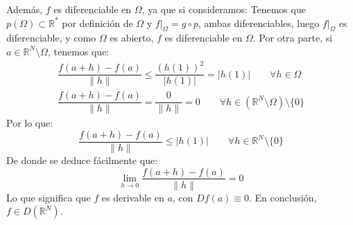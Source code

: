 \begin{ejercicio}
    \noindent
    Además, $f$ es diferenciable en $\Omega$, ya que si consideramos:
    Tenemos que $p(\Omega) \subset \mathbb{R}^\ast$ por definición de $\Omega$ y $f\big|_\Omega = g\circ p$, ambas diferenciables, luego $f\big|_\Omega$ es diferenciable, y como $\Omega$ es abierto, $f$ es diferenciable en $\Omega$. Por otra parte, si $a\in \mathbb{R}^N\setminus\Omega$, tenemos que:
    \begin{gather*}
        \dfrac{f(a+h)-f(a)}{\|h\|} \leq \dfrac{{(h(1))}^{2}}{|h(1)|} = |h(1)| \qquad \forall h\in \Omega \\
        \dfrac{f(a+h)-f(a)}{\|h\|} = \dfrac{0}{\|h\|} = 0 \qquad \forall h\in \left(\mathbb{R}^N\setminus \Omega\right)\setminus\{0\}
    \end{gather*}
    Por lo que:
    \begin{equation*}
        \dfrac{f(a+h)-f(a)}{\|h\|} \leq |h(1)| \qquad \forall h\in \mathbb{R}^N\setminus\{0\}
    \end{equation*}
    De donde se deduce fácilmente que:
    \begin{equation*}
        \lim_{h\to0}\dfrac{f(a+h)-f(a)}{\|h\|} = 0
    \end{equation*}
    Lo que significa que $f$ es derivable en $a$, con $Df(a) \equiv 0$. En conclusión, $f\in D(\mathbb{R}^N)$.\\


\end{ejercicio}
